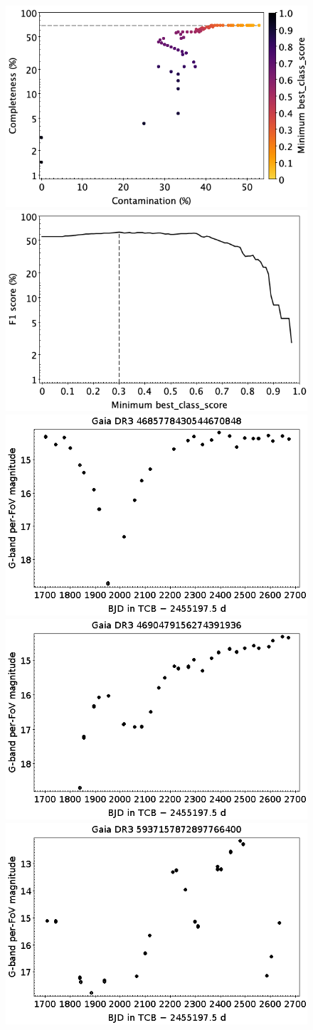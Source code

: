 \documentclass[longauth]{aa}
\begin{document}
\begin{appendix}
\begin{figure}
\centering
{} \includegraphics[width=0.45\hsize]{figures/appendix/RCB_cls_scc.png}  
\hspace{2mm}
 \includegraphics[width=0.45\hsize]{figures/appendix/RCB_cls_sf1.png} \\  
\vspace{4mm}
 \includegraphics[width=0.45\hsize]{figures/appendix/RCB-36.png}  
\hspace{2mm}
 \includegraphics[width=0.45\hsize]{figures/appendix/RCB-37.png} \\
\vspace{4mm}
 \includegraphics[width=0.45\hsize]{figures/appendix/RCB-41.png}  

\end{figure}
\end{appendix}
\end{document}
